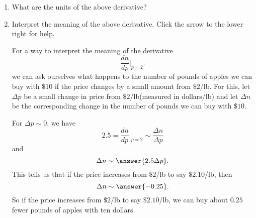 \documentclass{ximera}
\begin{document}
\begin{question}
\begin{enumerate}
\item What are the units of the above derivative?

\item Interpret the meaning of the above derivative. Click the arrow to the lower right for help.

\begin{expandable}

For a way to interpret the meaning of the derivative 
\[
         \frac{dn}{dp} \Big|_{p=2} . 
\]
we can ask ourselves what happens to the number of pounds of apples we can buy with $\$10$ if the price changes by a small amount from $\$2$/lb. For this, let $\Delta p$ be a small change in price from $\$2$/lb(measured in dollars/lb) and let $\Delta n$ be the corresponding change in the number of pounds we can buy with $\$10$.

For $\Delta p \sim 0$, we have
\[
    2.5 =  \frac{dn}{dp} \Big|_{p=2} \sim \frac{\Delta n}{\Delta p} 
\]
and
\[
     \Delta n \sim   \answer{2.5 \Delta p}.
\]
This tells us that if the price increases from $\$2$/lb to say $\$2.10$/lb, then
\[
   \Delta n \sim \answer{-0.25}.
\]
So if the price increases from $\$2$/lb to say $\$2.10$/lb, we can buy about $0.25$ fewer pounds of apples with ten dollars. 

\end{expandable}

\end{enumerate}



\end{question}
\end{document}
